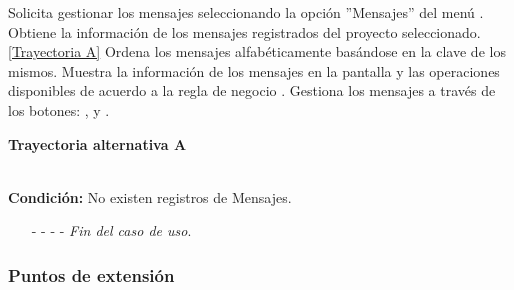 \begin{UCtrayectoria}
	\UCpaso[\UCactor] Solicita gestionar los mensajes seleccionando la opción ''Mensajes'' del menú .
	\UCpaso[\UCsist] Obtiene la información de los mensajes registrados del proyecto seleccionado. \hyperlink{CU9:TAA}{[Trayectoria A]}
	\UCpaso[\UCsist] Ordena los mensajes alfabéticamente basándose en la clave de los mismos.
	\UCpaso[\UCsist] Muestra la información de los mensajes en la pantalla  y las operaciones disponibles de acuerdo a la regla de negocio .
	\UCpaso[\UCactor] Gestiona los mensajes a través de los botones: , \editar y \eliminar. \label{CU9-P4}
\end{UCtrayectoria}		
\hypertarget{CU9:TAA}{\textbf{Trayectoria alternativa A}}\\
\noindent \textbf{Condición:} No existen registros de Mensajes.
\begin{enumerate}
	\UCpaso[\UCsist] Muestra el mensaje  en la pantalla  para indicar que no hay registros de mensajes para mostrar. \label{CU9-TA1}
	\UCpaso[\UCactor] Gestiona los mensajes a través del botón: . 
	\item[- -] - - {\em {Fin del caso de uso}}.%
\end{enumerate}


\subsubsection{Puntos de extensión}

